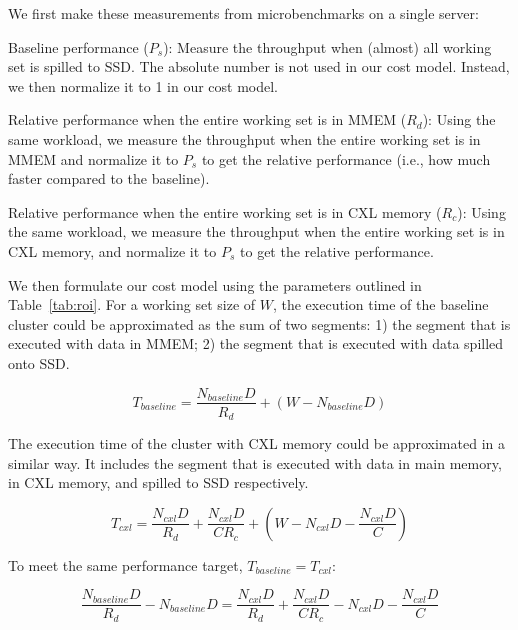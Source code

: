 We first make these measurements from microbenchmarks on a single server:
\begin{icompact}
  \item Baseline performance ($P_s$):
  Measure the throughput when (almost) all working set is spilled to SSD. The absolute number is not used in our cost model. Instead, we then normalize it to 1 in our cost model.
  \item Relative performance when the entire working set is in MMEM ($R_d$): Using the same workload, we measure the throughput when the entire working set is in MMEM and normalize it to $P_s$ to get the relative performance (i.e., how much faster compared to the baseline).
  \item Relative performance when the entire working set is in CXL memory ($R_c$): Using the same workload, we measure the throughput when the entire working set is in CXL memory, and normalize it to $P_s$ to get the relative performance.
\end{icompact}

We then formulate our cost model using the parameters outlined in Table~\ref{tab:roi}. For a working set size of $W$, the execution time of the baseline cluster could be approximated as the sum of two segments:
1) the segment that is executed with data in MMEM; 2) the segment that is executed with data spilled onto SSD.


$$
T_{baseline} = \frac{N_{baseline} D}{R_d} + (W - N_{baseline}D)
$$

The execution time of the cluster with CXL memory could be approximated in a similar way.
It includes the segment that is executed with data in main memory, in CXL memory, and spilled to SSD respectively.

$$ T_{cxl} = \frac{N_{cxl} D}{R_d} + \frac{N_{cxl} D}{CR_c} + (W - N_{cxl} D - \frac{N_{cxl} D}{C}) $$

To meet the same performance target, $T_{baseline} = T_{cxl}$:


$$
\frac{N_{baseline} D}{R_d} - N_{baseline} D = \frac{N_{cxl} D}{R_d} + \frac{N_{cxl} D}{CR_c} - N_{cxl} D - \frac{N_{cxl} D }{C}
$$


